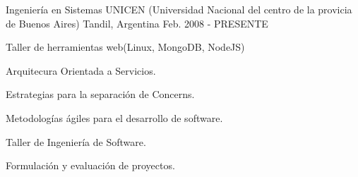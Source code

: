 


\begin{cventries}


\cventry
{Ingeniería en Sistemas} %
{UNICEN (Universidad Nacional del centro de la provicia de Buenos Aires)} %
{Tandil, Argentina} %
{Feb. 2008 - PRESENTE} %
{ %
\begin{cvitems}
\item {Taller de herramientas web(Linux, MongoDB, NodeJS)}
\item {Arquitecura Orientada a Servicios.}
\item {Estrategias para la separación de Concerns.}
\item {Metodologías ágiles para el desarrollo de software.}
\item {Taller de Ingeniería de Software.}
\item {Formulación y evaluación de proyectos.}
\end{cvitems}
}


\end{cventries}
